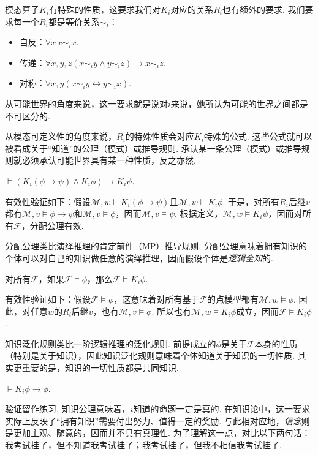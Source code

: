 模态算子$K_i$有特殊的性质，这要求我们对$K_i$对应的关系$R_i$也有额外的要求. 我们要求每一个$R_i$都是等价关系$\sim_i$：
    \begin{itemize}
        \item 自反：$\forall x\, x\sim_ix$.
        \item 传递：$\forall x,y,z(x\sim_iy\wedge y\sim_iz)\to x\sim_iz$.
        \item 对称：$\forall x,y(x \sim_i y\leftrightarrow y\sim_ix)$.
    \end{itemize}
从可能世界的角度来说，这一要求就是说对$i$来说，她所认为可能的世界之间都是不可区分的.

从模态可定义性的角度来说，$R_i$的特殊性质会对应$K_i$特殊的公式. 这些公式就可以被看成关于“知道”的公理（模式）或推导规则. 承认某一条公理（模式）或推导规则就必须承认可能世界具有某一种性质，反之亦然.

\begin{axiom}[分配公理]
    $\vDash (K_i(\phi\to\psi)\wedge K_i\phi)\to K_i\psi$.
\end{axiom}
有效性验证如下：假设$\mathcal M,w\vDash K_i(\phi\to\psi)$且$\mathcal M,w\vDash K_i \phi$. 于是，对所有$R_i$后继$v$都有$\mathcal M,v\vDash\phi\to\psi$和$\mathcal M,v\vDash\phi$，因而$\mathcal M,v\vDash\psi$. 根据定义，$\mathcal M,w\vDash K_i\psi$，因而对所有$\mathcal F$，分配公理有效.

分配公理类比演绎推理的肯定前件（MP）推导规则. 分配公理意味着拥有知识的个体可以对自己的知识做任意的演绎推理，因而假设个体是\emph{逻辑全知}的.

\begin{principle}[知识泛化规则]
    对所有$\mathcal F$，如果$\mathcal F\vDash\phi$，那么$\mathcal F\vDash K_i\phi$.
\end{principle}
有效性验证如下：假设$\mathcal F\vDash\phi$，这意味着对所有基于$\mathcal F$的点模型都有$\mathcal M,w\vDash\phi$. 因此，对任意$w$的$R_i$后继$v$，也有$\mathcal M,v\vDash\phi$. 所以也有$\mathcal M,w\vDash K_i\phi$成立，因而$\mathcal F\vDash K_i\phi$.

知识泛化规则类比一阶逻辑推理的泛化规则. 前提成立的$\phi$是关于$\mathcal F$本身的性质（特别是关于知识），因此知识泛化规则意味着个体知道关于知识的一切性质. 其实更重要的是，知识的一切性质都是共同知识.%


\begin{axiom}[知识公理或真理公理]
    $\vDash K_i\phi\to\phi$.
\end{axiom}
验证留作练习. 知识公理意味着，$i$知道的命题一定是真的. 在知识论中，这一要求实际上反映了“拥有知识”需要付出努力、值得一定的奖励. 与此相对应地，\emph{信念}则是更加主观、随意的，因而并不具有真理性. 为了理解这一点，对比以下两句话：我考试挂了，但不知道我考试挂了；我考试挂了，但我不相信我考试挂了.

